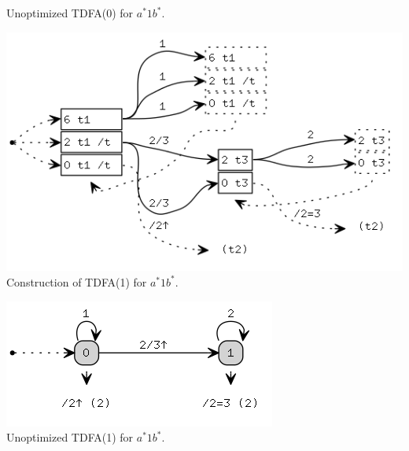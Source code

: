 \documentclass{article}
\theoremstyle{definition}
\begin{document}
\begin{multicols}{2}
\begin{center}
\footnotesize{Unoptimized TDFA(0) for $a^* 1 b^*$.} \\
\end{center}
\begin{center}
\includegraphics[width=0.8\linewidth]{img/example1/tdfa1_raw.png}\\
\footnotesize{Construction of TDFA(1) for $a^* 1 b^*$.} \\
\end{center}
\begin{center}
\includegraphics[width=0.6\linewidth]{img/example1/tdfa1.png}\\
\footnotesize{Unoptimized TDFA(1) for $a^* 1 b^*$.} \\
\end{center}


\end{multicols}
\end{document}
